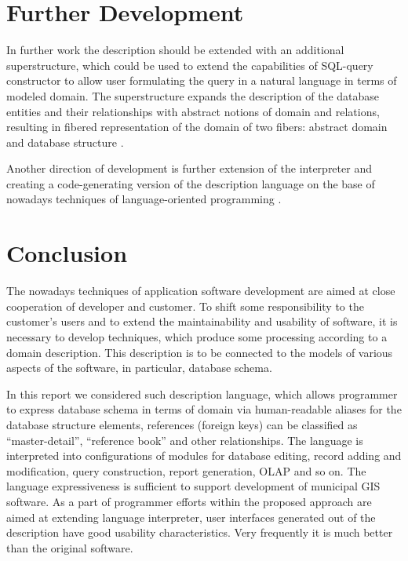 \documentclass[conference]{IEEEtran}
\begin{document}
\section{Further Development}

In further work the description should be extended with an additional superstructure, which could be used to extend the capabilities of SQL-query constructor to allow user formulating the query in a natural language in terms of modeled domain.  The superstructure expands the description of the database entities and their relationships with abstract notions of domain and relations, resulting in fibered representation of the domain of two fibers: abstract domain and database structure \cite{father,b2:15}.

Another direction of development is further extension of the interpreter and creating a code-generating version of the description language on the base of nowadays techniques of language-oriented programming \cite{annenkov}.

\section{Conclusion}

The nowadays techniques of application software development are aimed at close cooperation of developer and customer.  To shift some responsibility to the customer's users and to extend the maintainability and usability of software, it is necessary to develop techniques, which produce some processing according to a domain description.  This description is to be connected to the models of various aspects of the software, in particular, database schema.

In this report we considered such description language, which allows programmer to express database schema in terms of domain via human-readable aliases for the database structure elements, references (foreign keys) can be classified as ``master-detail'', ``reference book'' and other relationships.  The language is interpreted into configurations of modules for database editing, record adding and modification, query construction, report generation, OLAP and so on.  The language expressiveness is sufficient to support development of municipal GIS software.  As a part of programmer efforts within the proposed approach are aimed at extending language interpreter, user interfaces generated out of the description have good usability characteristics.  Very frequently it is much better than the original software.
\end{document}
